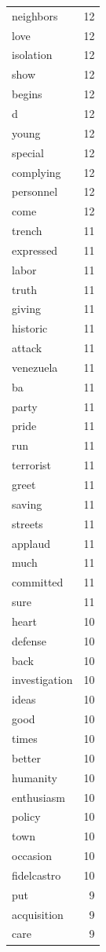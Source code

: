 \begin{tabular}{lr}
neighbors & 12 \\
love & 12 \\
isolation & 12 \\
show & 12 \\
begins & 12 \\
d & 12 \\
young & 12 \\
special & 12 \\
complying & 12 \\
personnel & 12 \\
come & 12 \\
trench & 11 \\
expressed & 11 \\
labor & 11 \\
truth & 11 \\
giving & 11 \\
historic & 11 \\
attack & 11 \\
venezuela & 11 \\
ba & 11 \\
party & 11 \\
pride & 11 \\
run & 11 \\
terrorist & 11 \\
greet & 11 \\
saving & 11 \\
streets & 11 \\
applaud & 11 \\
much & 11 \\
committed & 11 \\
sure & 11 \\
heart & 10 \\
defense & 10 \\
back & 10 \\
investigation & 10 \\
ideas & 10 \\
good & 10 \\
times & 10 \\
better & 10 \\
humanity & 10 \\
enthusiasm & 10 \\
policy & 10 \\
town & 10 \\
occasion & 10 \\
fidelcastro & 10 \\
put & 9 \\
acquisition & 9 \\
care & 9 \\

\end{tabular}
